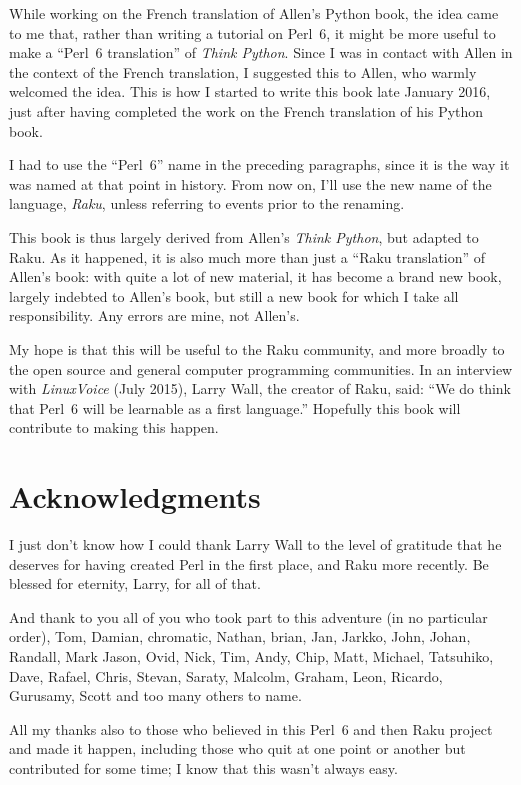 While working on the French translation of Allen's Python book, 
the idea came to me that, rather than writing a tutorial on 
Perl~6, it might be more useful to make a ``Perl~6 translation'' 
of \emph{Think Python}. Since I was in contact with Allen in the context 
of the French translation, I suggested this to Allen, who 
warmly welcomed the idea. This is how I started to write this 
book late January 2016, just after having completed the 
work on the French translation of his Python book.

I had to use the ``Perl~6'' name in the preceding paragraphs, since 
it is the way it was named at that point in history. From now on, 
I'll use the new name of the language, \emph{Raku}, unless referring 
to events prior to the renaming.

This book is thus largely derived from Allen's \emph{Think Python}, 
but adapted to Raku. As it happened, it is also much more 
than just a ``Raku translation'' of Allen's book: with 
quite a lot of new material, it has become a brand new book, 
largely indebted to Allen's book, but still a new book for which 
I take all responsibility. Any errors are mine, 
not Allen's.

My hope is that this will be useful to the Raku community, and 
more broadly to the open source and general 
computer programming communities. In an interview with 
\emph{LinuxVoice} (July 2015), Larry Wall, the creator of Raku, 
said: ``We do think that Perl~6 will be learnable as a first language.''
Hopefully this book will contribute to making this happen. 

\section*{Acknowledgments}

I just don't know how I could thank Larry Wall to the level of 
gratitude that he deserves for having created Perl in the first 
place, and Raku more recently. Be blessed for eternity, Larry, 
for all of that. 

And thank to you all of you who took part to this 
adventure (in no particular order), Tom, Damian, 
chromatic, Nathan, brian, Jan, Jarkko, John, Johan, Randall, 
Mark Jason, Ovid, Nick, Tim, Andy, Chip, Matt, Michael, Tatsuhiko, 
Dave, Rafael, Chris, Stevan, Saraty, Malcolm, Graham, Leon, 
Ricardo, Gurusamy, Scott and too many others to name.  

All my thanks also to those who believed in 
this Perl~6 and then Raku project and made it happen, including those who 
quit at one point or another but contributed for some 
time; I know that this wasn't always easy.

